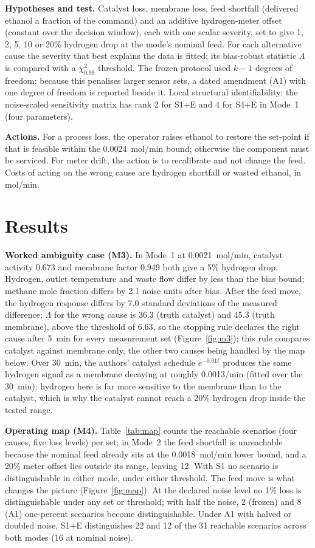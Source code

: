 \documentclass[10pt,a4paper]{article}
\begin{document}
\textbf{Hypotheses and test.} Catalyst loss, membrane loss, feed shortfall (delivered ethanol a fraction of the command) and an additive hydrogen-meter offset (constant over the decision window), each with one scalar severity, set to give 1, 2, 5, 10 or 20\% hydrogen drop at the mode's nominal feed. For each alternative cause the severity that best explains the data is fitted; its bias-robust statistic $\Lambda$ is compared with a $\chi^2_{0.99}$ threshold. The frozen protocol used $k-1$ degrees of freedom; because this penalises larger sensor sets, a dated amendment (A1) with one degree of freedom is reported beside it. Local structural identifiability: the noise-scaled sensitivity matrix has rank 2 for S1+E and 4 for S4+E in Mode~1 (four parameters).

\textbf{Actions.} For a process loss, the operator raises ethanol to restore the set-point if that is feasible within the 0.0024~mol/min bound; otherwise the component must be serviced. For meter drift, the action is to recalibrate and not change the feed. Costs of acting on the wrong cause are hydrogen shortfall or wasted ethanol, in mol/min.

\section{Results}
\textbf{Worked ambiguity case (M3).} In Mode~1 at 0.0021~mol/min, catalyst activity 0.673 and membrane factor 0.949 both give a 5\% hydrogen drop. Hydrogen, outlet temperature and waste flow differ by less than the bias bound; methane mole fraction differs by 2.1 noise units after bias. After the feed move, the hydrogen response differs by 7.0 standard deviations of the measured difference; $\Lambda$ for the wrong cause is 36.3 (truth catalyst) and 45.3 (truth membrane), above the threshold of 6.63, so the stopping rule declares the right cause after 5~min for every measurement set (Figure~\ref{fig:m3}); this rule compares catalyst against membrane only, the other two causes being handled by the map below. Over 30~min, the authors' catalyst schedule $e^{-0.01t}$ produces the same hydrogen signal as a membrane decaying at roughly 0.0013/min (fitted over the 30~min): hydrogen here is far more sensitive to the membrane than to the catalyst, which is why the catalyst cannot reach a 20\% hydrogen drop inside the tested range.

\textbf{Operating map (M4).} Table~\ref{tab:map} counts the reachable scenarios (four causes, five loss levels) per set; in Mode~2 the feed shortfall is unreachable because the nominal feed already sits at the 0.0018~mol/min lower bound, and a 20\% meter offset lies outside its range, leaving 12. With S1 no scenario is distinguishable in either mode, under either threshold. The feed move is what changes the picture (Figure~\ref{fig:map}). At the declared noise level no 1\% loss is distinguishable under any set or threshold; with half the noise, 2 (frozen) and 8 (A1) one-percent scenarios become distinguishable. Under A1 with halved or doubled noise, S1+E distinguishes 22 and 12 of the 31 reachable scenarios across both modes (16 at nominal noise).
\end{document}
